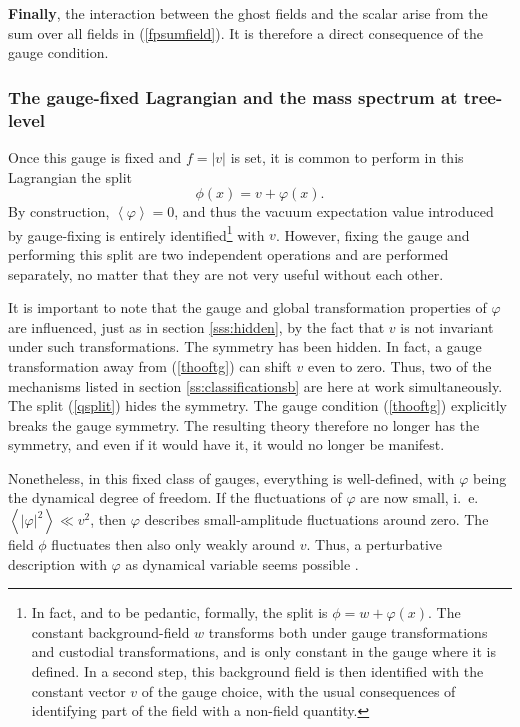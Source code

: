 \documentclass[final,twoside,12pt]{article}
\newcommand*{\no}{\noindent}
\newcommand*{\be}{\begin{equation}}
\newcommand*{\ee}{\end{equation}}
\newcommand*{\pref}[1]{(\ref{#1})}
\newcommand*{\1}{1\!\!\!\bot}
\newcommand*{\la}{\left\langle}
\newcommand*{\ra}{\right\rangle}
\begin{document}
{\bf Finally}, the interaction between the ghost fields and the scalar arise from the sum over all fields in \pref{fpsumfield}. It is therefore a direct consequence of the gauge condition.

\subsubsection{The gauge-fixed Lagrangian and the mass spectrum at tree-level}

Once this gauge is fixed and $f=|v|$ is set, it is common to perform in this Lagrangian the split \cite{Lee:1974zg,Bohm:2001yx}
\be
\phi(x)=v+\varphi(x)\label{qsplit}.
\ee
\no By construction, $\la\varphi\ra=0$, and thus the vacuum expectation value introduced by gauge-fixing is entirely identified\footnote{In fact, and to be pedantic, formally, the split is $\phi=w+\varphi(x)$. The constant background-field $w$ transforms both under gauge transformations and custodial transformations, and is only constant in the gauge where it is defined. In a second step, this background field is then identified with the constant vector $v$ of the gauge choice, with the usual consequences of identifying part of the field with a non-field quantity.} with $v$. However, fixing the gauge and performing this split are two independent operations and are performed separately, no matter that they are not very useful without each other.

It is important to note that the gauge and global transformation properties of $\varphi$ are influenced, just as in section \ref{sss:hidden}, by the fact that $v$ is not invariant under such transformations. The symmetry has been hidden. In fact, a gauge transformation away from \pref{thooftg} can shift $v$ even to zero. Thus, two of the mechanisms listed in section \ref{ss:classificationsb} are here at work simultaneously. The split \pref{qsplit} hides the symmetry. The gauge condition \pref{thooftg} explicitly breaks the gauge symmetry. The resulting theory therefore no longer has the symmetry, and even if it would have it, it would no longer be manifest.

Nonetheless, in this fixed class of gauges, everything is well-defined, with $\varphi$ being the dynamical degree of freedom. If the fluctuations of $\varphi$ are now small, i.\ e.\ $\la|\varphi|^2\ra\ll v^2$, then $\varphi$ describes small-amplitude fluctuations around zero. The field $\phi$ fluctuates then also only weakly around $v$. Thus, a perturbative description with $\varphi$ as dynamical variable seems possible \cite{Lee:1974zg,Damgaard:1985nb,Bohm:2001yx}.
\end{document}

